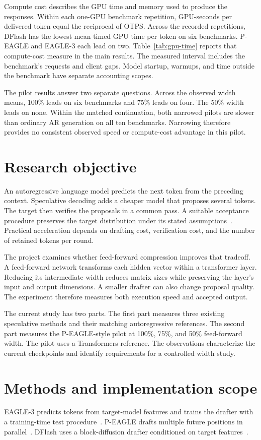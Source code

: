 \documentclass[conference,onecolumn]{IEEEtran}
\begin{document}
Compute cost describes the GPU time and memory used to produce the responses. Within each one-GPU benchmark repetition, GPU-seconds per delivered token equal the reciprocal of OTPS. Across the recorded repetitions, DFlash has the lowest mean timed GPU time per token on six benchmarks. P-EAGLE and EAGLE-3 each lead on two. Table~\ref{tab:gpu-time} reports that compute-cost measure in the main results. The measured interval includes the benchmark's requests and client gaps. Model startup, warmups, and time outside the benchmark have separate accounting scopes.

The pilot results answer two separate questions. Across the observed width means, 100\% leads on six benchmarks and 75\% leads on four. The 50\% width leads on none. Within the matched continuation, both narrowed pilots are slower than ordinary AR generation on all ten benchmarks. Narrowing therefore provides no consistent observed speed or compute-cost advantage in this pilot.

\section{Research objective}
An autoregressive language model predicts the next token from the preceding context. Speculative decoding adds a cheaper model that proposes several tokens. The target then verifies the proposals in a common pass. A suitable acceptance procedure preserves the target distribution under its stated assumptions~\cite{leviathan2023}. Practical acceleration depends on drafting cost, verification cost, and the number of retained tokens per round.

The project examines whether feed-forward compression improves that tradeoff. A feed-forward network transforms each hidden vector within a transformer layer. Reducing its intermediate width reduces matrix sizes while preserving the layer's input and output dimensions. A smaller drafter can also change proposal quality. The experiment therefore measures both execution speed and accepted output.

The current study has two parts. The first part measures three existing speculative methods and their matching autoregressive references. The second part measures the P-EAGLE-style pilot at 100\%, 75\%, and 50\% feed-forward width. The pilot uses a Transformers reference. The observations characterize the current checkpoints and identify requirements for a controlled width study.

\section{Methods and implementation scope}
EAGLE-3 predicts tokens from target-model features and trains the drafter with a training-time test procedure~\cite{eagle3}. P-EAGLE drafts multiple future positions in parallel~\cite{peagle}. DFlash uses a block-diffusion drafter conditioned on target features~\cite{dflash}.
\end{document}
